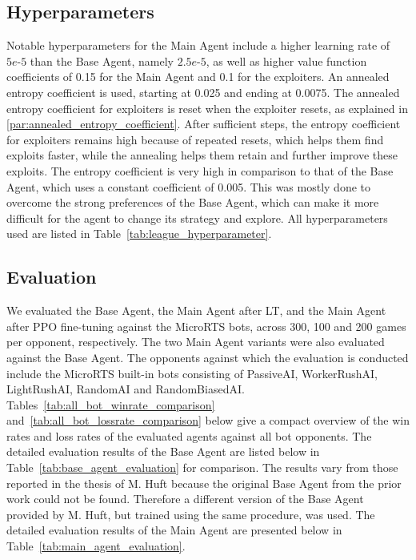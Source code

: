 \documentclass[10pt,twocolumn,letterpaper]{article}
\begin{document}
\FloatBarrier
\subsection{Hyperparameters}
Notable hyperparameters for the Main Agent include a higher learning rate of $5e\text{-}5$ than the Base Agent, namely $2.5e\text{-}5$, as well as higher value function coefficients of 0.15 for the Main Agent and 0.1 for the exploiters.
An annealed entropy coefficient is used, starting at 0.025 and ending at 0.0075.
The annealed entropy coefficient for exploiters is reset when the exploiter resets, as explained in \ref{par:annealed_entropy_coefficient}.
After sufficient steps, the entropy coefficient for exploiters remains high because of repeated resets, which helps them find exploits faster, while the annealing helps them retain and further improve these exploits.
The entropy coefficient is very high in comparison to that of the Base Agent, which uses a constant coefficient of 0.005.
This was mostly done to overcome the strong preferences of the Base Agent, which can make it more difficult for the agent to change its strategy and explore.
All hyperparameters used are listed in Table~\ref{tab:league_hyperparameter}.



\subsection{Evaluation}
We evaluated the Base Agent, the Main Agent after LT, and the Main Agent after PPO fine-tuning against the MicroRTS bots, across 300, 100 and 200 games per opponent, respectively.
The two Main Agent variants were also evaluated against the Base Agent.
The opponents against which the evaluation is conducted include the MicroRTS built-in bots consisting of PassiveAI, WorkerRushAI, LightRushAI, RandomAI and RandomBiasedAI.
Tables~\ref{tab:all_bot_winrate_comparison} and~\ref{tab:all_bot_lossrate_comparison} below give a compact overview of the win rates and loss rates of the evaluated agents against all bot opponents.
The detailed evaluation results of the Base Agent are listed below in Table~\ref{tab:base_agent_evaluation} for comparison.
The results vary from those reported in the thesis of M. Huft \cite{huft2023microrts} because the original Base Agent from the prior work could not be found.
Therefore a different version of the Base Agent provided by M. Huft, but trained using the same procedure, was used.
The detailed evaluation results of the Main Agent are presented below in Table~\ref{tab:main_agent_evaluation}.
\end{document}

